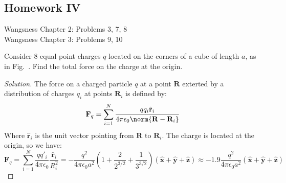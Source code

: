 \documentclass[crop=false,class=book,oneside]{standalone}
\begin{document}
        \subsection{Homework IV}
            Wangsness Chapter 2: Problems 3, 7, 8\\
            Wangsness Chapter 3: Problems 9, 10
            \begin{problem}[Wangsness 2-3]
                \label{problem:EMAG_wangsness_2_3}
                Consider $8$ equal point charges $q$ located on
                the corners of a cube of length $a$, as in
                Fig.~.
                Find the total force on the charge at the origin.
            \end{problem}
            \begin{proof}[Solution]
                The force on a charged particle $q$ at a point $\mathbf{R}$
                exterted by a distribution of charges $q_{i}$ at points
                $\mathbf{R}_{i}$ is defined by:
                \begin{equation*}
                    \mathbf{F}_{q}
                    =\sum_{i=1}^{N}
                    \frac{qq_{i}\hat{\mathbf{r}}_{i}}
                         {4\pi\epsilon_{0}\norm{\mathbf{R}-\mathbf{R}_{i}}}
                \end{equation*}
                Where $\hat{\mathbf{r}}_{i}$ is the unit vector
                pointing from $\mathbf{R}$ to $\mathbf{R}_{i}$.
                The charge is located at the origin, so we have:
                \begin{equation*}
                    \mathbf{F}_q=
                    \sum_{i=1}^{N}\frac{qq'_{i}}{4\pi\epsilon_0}
                    \frac{\hat{\mathbf{r}}_{i}}{R_{i}^{2}}
                    =-\frac{q^{2}}{4\pi \epsilon_0 a^{2}}
                    (1+\frac{2}{2^{3/2}}+\frac{1}{3^{3/2}})
                    (\hat{\mathbf{x}}+\hat{\mathbf{y}}
                    +\hat{\mathbf{z}})
                    \approx-1.9\frac{q^{2}}{4\pi\epsilon_{0}a^{2}}
                    (\hat{\mathbf{x}}
                    +\hat{\mathbf{y}}
                    +\hat{\mathbf{z}})
                \end{equation*}
            \end{proof}
\end{document}
